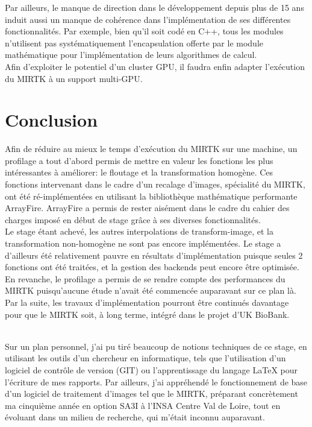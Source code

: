 \documentclass[10pt]{report}
\begin{document}
	Par ailleurs, le manque de direction dans le développement depuis plus de 15 ans induit aussi un manque de cohérence dans l'implémentation de ses différentes fonctionnalités. Par exemple, bien qu'il soit codé en C++, tous les modules n'utilisent pas systématiquement l'encapsulation offerte par le module mathématique pour l'implémentation de leurs algorithmes de calcul.\\	
	Afin d'exploiter le potentiel d'un cluster GPU, il faudra enfin adapter l'exécution du MIRTK à un support multi-GPU.  

\chapter*{Conclusion} 
Afin de réduire au mieux le temps d'exécution du MIRTK sur une machine, un profilage a tout d'abord permis de mettre en valeur les fonctions les plus intéressantes à améliorer: le floutage et la transformation homogène. Ces fonctions intervenant dans le cadre d'un recalage d'images, spécialité du MIRTK, ont été ré-implémentées en utilisant la bibliothèque mathématique performante ArrayFire. ArrayFire a permis de rester aisément dans le cadre du cahier des charges imposé en début de stage grâce à ses diverses fonctionnalités. \\
Le stage étant achevé, les autres interpolations de transform-image, et la transformation non-homogène ne sont pas encore implémentées. Le stage a d'ailleurs été relativement pauvre en résultats d'implémentation puisque seules 2 fonctions ont été traitées, et la gestion des backends peut encore être optimisée. En revanche, le profilage a permis de se rendre compte des performances du MIRTK puisqu'aucune étude n'avait été commencée auparavant sur ce plan là. Par la suite, les travaux d'implémentation pourront être continués davantage pour que le MIRTK soit, à long terme, intégré dans le projet d'UK BioBank. \\ ~\par
\noindent
Sur un plan personnel, j'ai pu tiré beaucoup de notions techniques de ce stage, en utilisant les outils d'un chercheur en informatique, tels que l'utilisation d'un logiciel de contrôle de version (GIT) ou l'apprentissage du langage LaTeX pour l'écriture de mes rapports. Par ailleurs, j'ai appréhendé le fonctionnement de base d'un logiciel de traitement d'images tel que le MIRTK, préparant concrètement ma cinquième année en option SA3I à l'INSA Centre Val de Loire, tout en évoluant dans un milieu de recherche, qui m'était inconnu auparavant.
\end{document}
